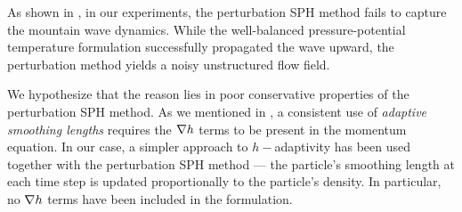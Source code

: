 \documentclass[../main.tex]{subfiles}
\begin{document}
As shown in , in our experiments, the perturbation SPH method fails to capture the mountain wave dynamics. While the well-balanced pressure-potential temperature formulation successfully propagated the wave upward, the perturbation method yields a noisy unstructured flow field. 

We hypothesize that the reason lies in poor conservative properties of the perturbation SPH method. As we mentioned in , a consistent use of \emph{adaptive smoothing lengths} requires the $\nabla h$ terms to be present in the momentum equation. In our case, a simpler approach to $h-$adaptivity has been used together with the perturbation SPH method --- the particle's smoothing length at each time step is updated proportionally to the particle's density. In particular, no $\nabla h$ terms have been included in the formulation.
\end{document}
